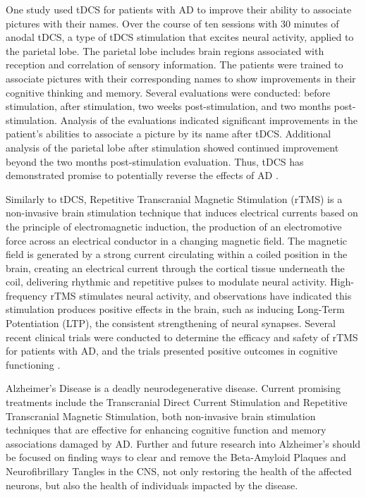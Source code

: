 One study used tDCS for patients with AD to improve their ability to associate pictures with their names. Over the course of ten sessions with 30 minutes of anodal tDCS, a type of tDCS stimulation that excites neural activity, applied to the parietal lobe. The parietal lobe includes brain regions associated with reception and correlation of sensory information. The patients were trained to associate pictures with their corresponding names to show improvements in their cognitive thinking and memory. Several evaluations were conducted: before stimulation, after stimulation, two weeks post-stimulation, and two months post-stimulation. Analysis of the evaluations indicated significant improvements in the patient’s abilities to associate a picture by its name after tDCS. Additional analysis of the parietal lobe after stimulation showed continued improvement beyond the two months post-stimulation evaluation. Thus, tDCS has demonstrated promise to potentially reverse the effects of AD \cite{Chertkow}.

Similarly to tDCS, Repetitive Transcranial Magnetic Stimulation (rTMS) is a non-invasive brain stimulation technique that induces electrical currents based on the principle of electromagnetic induction, the production of an electromotive force across an electrical conductor in a changing magnetic field. The magnetic field is generated by a strong current  circulating within a coiled position in the brain, creating an electrical current through the cortical tissue underneath the coil, delivering rhythmic and repetitive pulses to modulate neural activity. High-frequency rTMS stimulates neural activity, and observations have indicated this stimulation produces positive effects in the brain, such as inducing Long-Term Potentiation (LTP), the consistent strengthening of neural synapses. Several recent clinical trials were conducted to determine the efficacy and safety of rTMS for patients with AD, and the trials presented positive outcomes in cognitive functioning \cite{Dong}.

Alzheimer’s Disease is a deadly neurodegenerative disease. Current promising treatments include the Transcranial Direct Current Stimulation and Repetitive Transcranial Magnetic Stimulation, both non-invasive brain stimulation techniques that are effective for enhancing cognitive function and memory associations damaged by AD. Further and future research into Alzheimer’s should be focused on finding ways to clear and remove the Beta-Amyloid Plaques and Neurofibrillary Tangles in the CNS, not only restoring the health of the affected neurons, but also the health of individuals impacted by the disease.

